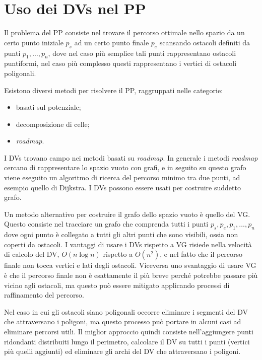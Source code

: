 \documentclass[a4paper,oneside]{article}
\begin{document}
\section{Uso dei \aclp{DV} nel \acl{PP}}
Il problema del \ac{PP} consiste nel trovare il percorso
ottimale nello spazio
da un certo punto iniziale $p_s$ ad un certo punto finale
$p_e$ scansando ostacoli definiti da punti $p_1,\dots, p_n$, dove nel
caso pi\`u semplice tali punti rappresentano ostacoli puntiformi, nel
caso più complesso questi rappresentano i vertici di ostacoli
poligonali.

Esistono diversi metodi per risolvere il \ac{PP}, raggruppati nelle
categorie:
\begin{itemize}
\item basati sul potenziale;
\item decomposizione di celle;
\item \emph{roadmap}.
\end{itemize}
I \acp{DV} trovano campo nei metodi basati su \emph{roadmap}. In
generale i metodi \emph{roadmap} cercano di rappresentare lo spazio
vuoto con grafi, e in seguito su questo grafo viene eseguito un
algoritmo di ricerca del percorso minimo tra due punti, ad esempio
quello di Dijkstra. I \acp{DV} possono essere usati per costruire
suddetto grafo.

Un metodo alternativo per costruire il grafo dello spazio vuoto \`e
quello del \ac{VG}. Questo consiste nel tracciare un grafo che comprenda tutti i punti
$p_s,p_e,p_1,\dots,p_n$ dove ogni punto \`e collegato a tutti gli
altri punti che sono visibili, ossia non coperti da
ostacoli.
I vantaggi di usare i \acp{DV} rispetto a \ac{VG} risiede nella
velocit\`a di calcolo del \ac{DV}, $O(n \log n)$ rispetto a $O(n^2)$,
e nel fatto che il percorso finale non tocca vertici e lati degli
ostacoli. Viceversa uno svantaggio di usare \ac{VG} \`e che
il percorso finale non \`e esattamente il pi\`u breve perch\'e
potrebbe passare pi\`u vicino agli ostacoli, ma questo pu\`o essere
mitigato applicando processi di raffinamento del percorso.

Nel caso in cui gli ostacoli siano poligonali occorre eliminare i
segmenti del \ac{DV} che attraversano i poligoni, ma questo processo
pu\`o portare in alcuni casi ad eliminare percorsi utili. Il miglior
approccio quindi consiste nell'aggiungere
punti ridondanti distribuiti lungo il perimetro, calcolare il \ac{DV}
su tutti i punti (vertici pi\`u quelli aggiunti) ed eliminare gli
archi del \ac{DV} che attraversano i poligoni.
\end{document}
